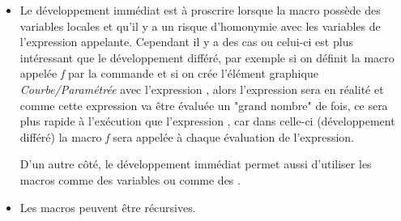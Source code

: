 \begin{itemize}
\item Le développement immédiat est à proscrire lorsque la macro possède des variables locales et qu'il y a un risque d'homonymie avec les variables de l'expression appelante. Cependant il y a des cas ou celui-ci est plus intéressant que le développement différé, par exemple si on définit la macro appelée \textsl{f} par la commande  et si on crée l'élément graphique \textsl{Courbe/Paramétrée} avec l'expression , alors l'expression sera en réalité  et comme cette expression va être évaluée un "grand nombre" de fois, ce sera plus rapide à l'exécution que l'expression , car dans celle-ci (développement différé) la macro \textsl{f} sera appelée à chaque évaluation de l'expression. 

D'un autre côté, le développement immédiat permet aussi d'utiliser les macros comme des variables ou comme des . 

\item Les macros peuvent être récursives.
\end{itemize}

